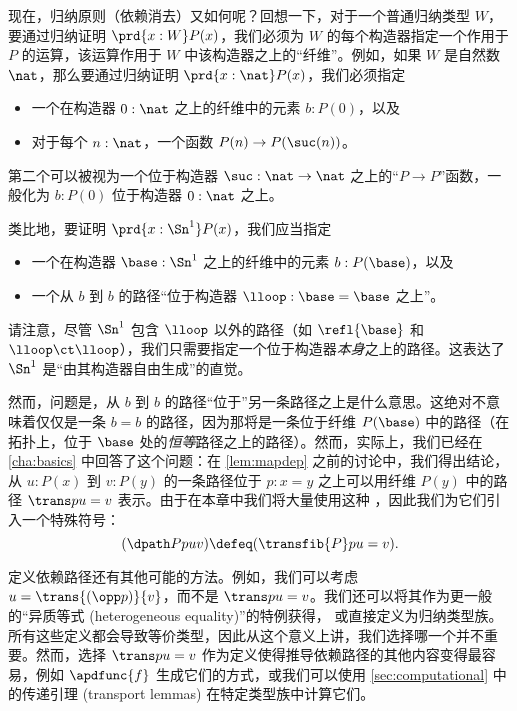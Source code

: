 %
%
现在，归纳原则（依赖消去）又如何呢？回想一下，对于一个普通归纳类型 $W$，要通过归纳证明 $\prd{x:W} P(x)$，我们必须为 $W$ 的每个构造器指定一个作用于 $P$ 的运算，该运算作用于 $W$ 中该构造器之上的“纤维”。例如，如果 $W$ 是自然数 $\nat$，那么要通过归纳证明 $\prd{x:\nat} P(x)$，我们必须指定
\begin{itemize}
  \item 一个在构造器 $0:\nat$ 之上的纤维中的元素 $b:P(0)$，以及
  \item 对于每个 $n:\nat$，一个函数 $P(n) \to P(\suc(n))$。
\end{itemize}
第二个可以被视为一个位于构造器 $\suc:\nat\to\nat$ 之上的“$P\to P$”函数，一般化为 $b:P(0)$ 位于构造器 $0:\nat$ 之上。

类比地，要证明 $\prd{x:\Sn^1} P(x)$，我们应当指定
\begin{itemize}
  \item 一个在构造器 $\base:\Sn^1$ 之上的纤维中的元素 $b:P(\base)$，以及
  \item 一个从 $b$ 到 $b$ 的路径“位于构造器 $\lloop:\base=\base$ 之上”。
\end{itemize}
请注意，尽管 $\Sn^1$ 包含 $\lloop$ 以外的路径（如 $\refl{\base}$ 和 $\lloop\ct\lloop$），我们只需要指定一个位于构造器\emph{本身}之上的路径。这表达了 $\Sn^1$ 是“由其构造器自由生成”的直觉。

然而，问题是，从 $b$ 到 $b$ 的路径“位于”另一条路径之上是什么意思。这绝对不意味着仅仅是一条 $b=b$ 的路径，因为那将是一条位于纤维 $P(\base)$ 中的路径（在拓扑上，位于 $\base$ 处的\emph{恒等}路径之上的路径）。然而，实际上，我们已经在 \cref{cha:basics} 中回答了这个问题：在 \cref{lem:mapdep} 之前的讨论中，我们得出结论，从 $u:P(x)$ 到 $v:P(y)$ 的一条路径位于 $p:x=y$ 之上可以用纤维 $P(y)$ 中的路径 $\trans p u = v$ 表示。由于在本章中我们将大量使用这种%
%
，因此我们为它们引入一个特殊符号：
\begin{equation}
(\dpath P p u v) \defeq (\transfib{P} p u = v).\label{eq:dpath}
\end{equation}

\begin{rmk}
  定义依赖路径还有其他可能的方法。例如，我们可以考虑 $u = \trans{(\opp p)}{v}$，而不是 $\trans p u = v$。我们还可以将其作为更一般的“异质等式 (heterogeneous equality)”的特例获得，
  或直接定义为归纳类型族。所有这些定义都会导致等价类型，因此从这个意义上讲，我们选择哪一个并不重要。然而，选择 $\trans p u = v$ 作为定义使得推导依赖路径的其他内容变得最容易，例如 $\apdfunc{f}$ 生成它们的方式，或我们可以使用 \cref{sec:computational} 中的传递引理 (transport lemmas) 在特定类型族中计算它们。
\end{rmk}

